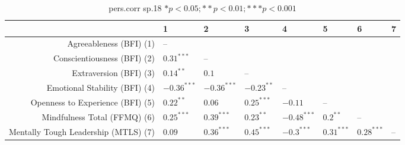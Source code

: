 \begin{table}[ht]
\centering
\begin{tabular}{rlllllll}
  \hline
 & 1 & 2 & 3 & 4 & 5 & 6 & 7 \\ 
  \hline
Agreeableness (BFI) (1) & -- &  &  &  &  &  &  \\ 
  Conscientiousness (BFI) (2) & $0.31^{***}$ & -- &  &  &  &  &  \\ 
  Extraversion (BFI) (3) & $0.14^{**}$ & $0.1$ & -- &  &  &  &  \\ 
  Emotional Stability (BFI) (4) & $-0.36^{***}$ & $-0.36^{***}$ & $-0.23^{**}$ & -- &  &  &  \\ 
  Openness to Experience (BFI) (5) & $0.22^{**}$ & $0.06$ & $0.25^{***}$ & $-0.11$ & -- &  &  \\ 
  Mindfulness Total (FFMQ) (6) & $0.25^{***}$ & $0.39^{***}$ & $0.23^{**}$ & $-0.48^{***}$ & $0.2^{**}$ & -- &  \\ 
  Mentally Tough Leadership (MTLS) (7) & $0.09$ & $0.36^{***}$ & $0.45^{***}$ & $-0.3^{***}$ & $0.31^{***}$ & $0.28^{***}$ & -- \\ 
   \hline
\end{tabular}
\caption{pers.corr sp.18 $* p < 0.05; ** p < 0.01; *** p < 0.001$} 
\label{freq_corr.pers.corr.sp.18}
\end{table}
